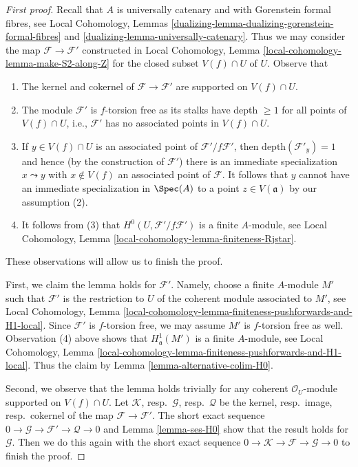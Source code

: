\begin{proof}[First proof]
Recall that $A$ is universally catenary and with Gorenstein
formal fibres, see Local Cohomology, Lemmas
\ref{dualizing-lemma-dualizing-gorenstein-formal-fibres} and
\ref{dualizing-lemma-universally-catenary}. Thus we may consider the map
$\mathcal{F} \to \mathcal{F}'$ constructed in
Local Cohomology, Lemma \ref{local-cohomology-lemma-make-S2-along-Z}
for the closed subset $V(f) \cap U$ of $U$.
Observe that
\begin{enumerate}
\item The kernel and cokernel of $\mathcal{F} \to \mathcal{F}'$
are supported on $V(f) \cap U$.
\item The module $\mathcal{F}'$ is $f$-torsion free as its stalks have
depth $\geq 1$ for all points of $V(f) \cap U$, i.e., $\mathcal{F}'$
has no associated points in $V(f) \cap U$.
\item If $y \in V(f) \cap U$ is an associated point of
$\mathcal{F}'/f\mathcal{F}'$, then
$\text{depth}(\mathcal{F}'_y) = 1$
and hence (by the construction of $\mathcal{F}'$)
there is an immediate specialization $x \leadsto y$
with $x \not \in V(f)$ an associated point of $\mathcal{F}$.
It follows that $y$ cannot have
an immediate specialization in $\Spec(A)$
to a point $z \in V(\mathfrak a)$ by our assumption (2).
\item It follows from (3) that $H^0(U, \mathcal{F}'/f\mathcal{F}')$
is a finite $A$-module, see
Local Cohomology, Lemma \ref{local-cohomology-lemma-finiteness-Rjstar}.
\end{enumerate}
These observations will allow us to finish the proof.

\medskip\noindent
First, we claim the lemma holds for $\mathcal{F}'$.
Namely, choose a finite $A$-module $M'$ such that $\mathcal{F}'$
is the restriction
to $U$ of the coherent module associated to $M'$, see Local Cohomology,
Lemma \ref{local-cohomology-lemma-finiteness-pushforwards-and-H1-local}.
Since $\mathcal{F}'$ is $f$-torsion free, we may assume $M'$
is $f$-torsion free as well. Observation (4) above shows that
$H^1_\mathfrak a(M')$ is a finite $A$-module, see Local Cohomology,
Lemma \ref{local-cohomology-lemma-finiteness-pushforwards-and-H1-local}.
Thus the claim by Lemma \ref{lemma-alternative-colim-H0}.

\medskip\noindent
Second, we observe that the lemma holds trivially for any coherent
$\mathcal{O}_U$-module supported on $V(f) \cap U$.
Let $\mathcal{K}$, resp.\ $\mathcal{G}$, resp.\ $\mathcal{Q}$
be the kernel, resp.\ image, resp.\ cokernel of the map
$\mathcal{F} \to \mathcal{F}'$.
The short exact sequence
$0 \to \mathcal{G} \to \mathcal{F}' \to \mathcal{Q} \to 0$
and Lemma \ref{lemma-ses-H0} show that the result holds for
$\mathcal{G}$. Then we do this again with the short exact sequence
$0 \to \mathcal{K} \to \mathcal{F} \to \mathcal{G} \to 0$
to finish the proof.
\end{proof}


